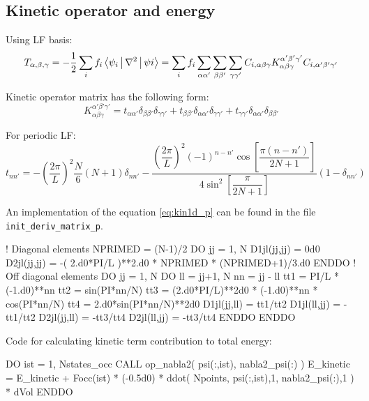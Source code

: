 \subsection{Kinetic operator and energy}

Using LF basis:
\begin{equation}
T_{\alpha,\beta,\gamma} = -\frac{1}{2} \sum_{i} f_{i}
\Braket{ \psi_{i} | \nabla^2 | \psi{i} } =
\sum_{i} f_{i} \sum_{\alpha\alpha'} \sum_{\beta\beta'} \sum_{\gamma\gamma'}
C_{i,\alpha\beta\gamma} K_{\alpha\beta\gamma}^{\alpha'\beta'\gamma'}
C_{i,\alpha'\beta'\gamma'}
\end{equation}

Kinetic operator matrix has the following form:
\begin{equation}
K_{\alpha\beta\gamma}^{\alpha'\beta'\gamma'} =
t_{\alpha\alpha'}\delta_{\beta\beta'}\delta_{\gamma\gamma'} +
t_{\beta\beta'}\delta_{\alpha\alpha'}\delta_{\gamma\gamma'} +
t_{\gamma\gamma'}\delta_{\alpha\alpha'}\delta_{\beta\beta'}
\end{equation}

For periodic LF:
\begin{equation}
t_{nn'} = -\left( \frac{2\pi}{L} \right)^2 \frac{N}{6} \left( N + 1 \right) \delta_{nn'} -
\dfrac{ \left(\dfrac{2\pi}{L}\right)^2 (-1)^{n-n'}\cos\left[\dfrac{\pi(n-n')}{2N+1}\right]}
{4\sin^2\left[\dfrac{\pi}{2N+1}\right]}
(1-\delta_{nn'})
\label{eq:kin1d_p}
\end{equation}

An implementation of the equation \eqref{eq:kin1d_p} can be found in the file
{\tt init\_deriv\_matrix\_p}.
\begin{fortrancode}
! Diagonal elements
NPRIMED = (N-1)/2
DO jj = 1, N
  D1jl(jj,jj) = 0d0
  D2jl(jj,jj) = -( 2.d0*PI/L )**2.d0 * NPRIMED * (NPRIMED+1)/3.d0
ENDDO
! Off diagonal elements
DO jj = 1, N
  DO ll = jj+1, N
    nn = jj - ll
    tt1 = PI/L * (-1.d0)**nn
    tt2 = sin(PI*nn/N)
    tt3 = (2.d0*PI/L)**2d0 * (-1.d0)**nn * cos(PI*nn/N)
    tt4 = 2.d0*sin(PI*nn/N)**2d0
    D1jl(jj,ll) =  tt1/tt2
    D1jl(ll,jj) = -tt1/tt2
    D2jl(jj,ll) = -tt3/tt4
    D2jl(ll,jj) = -tt3/tt4
  ENDDO
ENDDO
\end{fortrancode}

Code for calculating kinetic term contribution to total energy:
\begin{fortrancode}
DO ist = 1, Nstates_occ
  CALL op_nabla2( psi(:,ist), nabla2_psi(:) )
  E_kinetic = E_kinetic + Focc(ist) * (-0.5d0) * ddot( Npoints, psi(:,ist),1, nabla2_psi(:),1 ) * dVol
ENDDO
\end{fortrancode}

